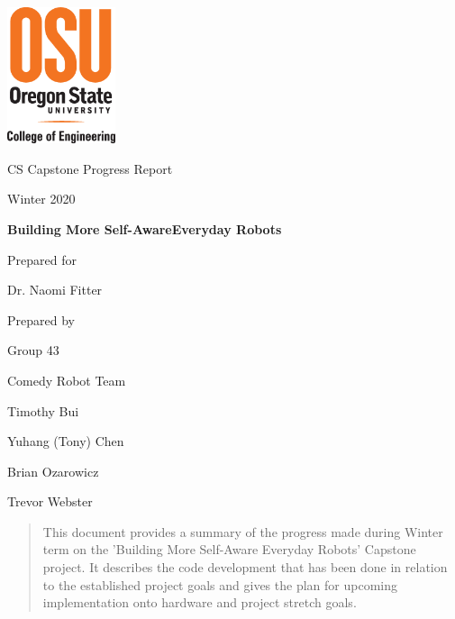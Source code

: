 \documentclass[onecolumn, draftclsnofoot,10pt, compsoc]{IEEEtran}
\def \CapstoneTeamName{		    Comedy Robot Team}
\def \CapstoneTeamNumber{		43}
\def \GroupMemberOne{			Timothy Bui}
\def \GroupMemberTwo{			Yuhang (Tony) Chen}
\def \GroupMemberThree{			Brian Ozarowicz}
\def \GroupMemberFour{			Trevor Webster}
\def \CapstoneProjectName{		Building More Self-Aware\linebreak Everyday Robots}
\def \CapstoneSponsorCompany{	SHARE Lab}
\def \CapstoneSponsorPerson{	Dr. Naomi Fitter}
\def \DocType{	%
				Progress Report
				}
\newcommand{\NameSigPair}[1]{\par
\makebox[2.75in][r]{#1} \hfil 	\makebox[3.25in]{\makebox[2.25in]{\hrulefill} \hfill		\makebox[.75in]{\hrulefill}}
\par\vspace{-12pt} \textit{\tiny\noindent
\makebox[2.75in]{} \hfil		\makebox[3.25in]{\makebox[2.25in][r]{Signature} \hfill	\makebox[.75in][r]{Date}}}}
\renewcommand{\NameSigPair}[1]{#1}
\begin{document}
\begin{titlepage}
    \begin{singlespace}
    	\includegraphics[height=4cm]{coe_v_spot1}
        \hfill 
        \par\vspace{.2in}
        \centering
        \scshape{
            \huge CS Capstone \DocType \par
            {\large Winter 2020}\par
            \vspace{.5in}
            \textbf{\Huge\CapstoneProjectName}\par
            \vfill
            {\large Prepared for}\par
            {\Large\NameSigPair{\CapstoneSponsorPerson}\par}
            {\large Prepared by }\par
            Group\CapstoneTeamNumber\par
            \CapstoneTeamName\par 
            \vspace{5pt}
            {\Large
                \NameSigPair{\GroupMemberOne}\par
                \NameSigPair{\GroupMemberTwo}\par
                \NameSigPair{\GroupMemberThree}\par
                \NameSigPair{\GroupMemberFour}\par
            }
            \vspace{20pt}
        }
        \begin{abstract}
        	\noindent This document provides a summary of the progress made during Winter term on the 'Building More Self-Aware Everyday Robots' Capstone project. It describes the code development that has been done in relation to the established project goals and gives the plan for upcoming implementation onto hardware and project stretch goals.
        \end{abstract}
    \end{singlespace}
\end{titlepage}
\newpage
{}
\tableofcontents
\clearpage
\end{document}
